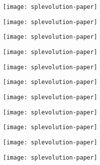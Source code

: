 \documentclass{beamer}
\begin{document}
	\begin{frame}[plain]
		\texttt{[image: splevolution-paper]}
	\end{frame}

	\begin{frame}[plain]
		\texttt{[image: splevolution-paper]}
	\end{frame}

	\begin{frame}[plain]
		\texttt{[image: splevolution-paper]}
	\end{frame}

	\begin{frame}[plain]
		\centering\texttt{[image: splevolution-paper]}

		\texttt{[image: splevolution-paper]}
	\end{frame}

	\begin{frame}[plain]
		\centering\texttt{[image: splevolution-paper]}

		\texttt{[image: splevolution-paper]}
	\end{frame}

	\begin{frame}[plain]
		\centering\texttt{[image: splevolution-paper]}

		\texttt{[image: splevolution-paper]}
	\end{frame}

	\begin{frame}[plain]
		\centering\texttt{[image: splevolution-paper]}

		\texttt{[image: splevolution-paper]}
	\end{frame}
\end{document}
